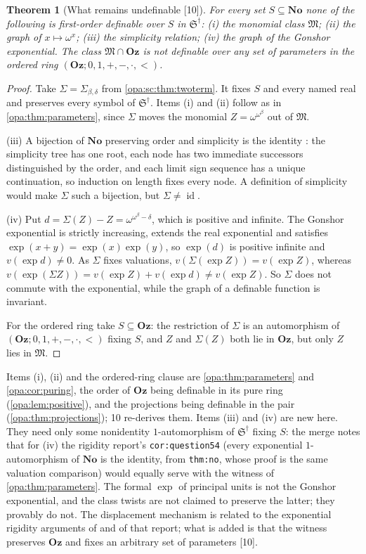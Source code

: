 \documentclass[11pt,oneside]{article}
\numberwithin{equation}{section}
\newtheorem{theorem}{Theorem}[section]
\theoremstyle{definition}
\theoremstyle{remark}
\newcommand{\No}{\mathbf{No}}
\newcommand{\Oz}{\mathbf{Oz}}
\newcommand{\Mon}{\mathfrak M}
\newcommand{\id}{\operatorname{id}}
\newcommand{\src}[1]{\textup{\textsf{\small[#1]}}}
\newcommand{\lbl}[1]{\nolinkurl{#1}}
\begin{document}
\begin{theorem}[What remains undefinable \src{10}]\label{opa:sc:thm:undef}
For every set $S\subseteq\No$ none of the following is first-order definable over
$S$ in $\mathfrak S^\dagger$: \textup{(i)} the monomial class $\Mon$;
\textup{(ii)} the graph of $x\mapsto\omega^x$; \textup{(iii)} the simplicity
relation; \textup{(iv)} the graph of the Gonshor exponential. The class
$\Mon\cap\Oz$ is not definable over any set of parameters in the ordered ring
$(\Oz;0,1,+,-,\cdot,<)$.
\end{theorem}
\begin{proof}
Take $\Sigma=\Sigma_{\beta,\delta}$ from \cref{opa:sc:thm:twoterm}. It fixes $S$ and every
named real and preserves every symbol of $\mathfrak S^\dagger$. Items (i) and (ii)
follow as in \cref{opa:thm:parameters}, since $\Sigma$ moves the monomial
$Z=\omega^{\omega^\beta}$ out of $\Mon$.

(iii) A bijection of $\No$ preserving order and simplicity is the identity
\cite[Proposition 5.1]{KKS}: the simplicity tree has one root, each node has two
immediate successors distinguished by the order, and each limit sign sequence has
a unique continuation, so induction on length fixes every node. A definition of
simplicity would make $\Sigma$ such a bijection, but $\Sigma\ne\id$.

(iv) Put $d=\Sigma(Z)-Z=\omega^{\omega^\beta-\delta}$, which is positive and infinite.
The Gonshor exponential is strictly increasing, extends the real exponential and
satisfies $\exp(x+y)=\exp(x)\exp(y)$, so $\exp(d)$ is positive infinite and
$v(\exp d)\ne0$. As $\Sigma$ fixes valuations,
$v(\Sigma(\exp Z))=v(\exp Z)$, whereas
$v(\exp(\Sigma Z))=v(\exp Z)+v(\exp d)\ne v(\exp Z)$. So $\Sigma$ does not commute
with the exponential, while the graph of a definable function is invariant.

For the ordered ring take $S\subseteq\Oz$: the restriction of $\Sigma$ is an
automorphism of $(\Oz;0,1,+,-,\cdot,<)$ fixing $S$, and $Z$ and $\Sigma(Z)$ both lie in
$\Oz$, but only $Z$ lies in $\Mon$.
\end{proof}

Items (i), (ii) and the ordered-ring clause are \cref{opa:thm:parameters} and
\cref{opa:cor:puring}, the order of $\Oz$ being definable in its pure ring
(\cref{opa:lem:positive}), and the projections being definable in the pair
(\cref{opa:thm:projections}); 10 re-derives them. Items (iii) and (iv) are new
here. They need only some nonidentity $1$-automorphism of $\mathfrak S^\dagger$
fixing $S$: the merge notes that for (iv) the rigidity report's
\lbl{cor:question54} (every exponential $1$-automorphism of $\No$ is the
identity, from \lbl{thm:no}, whose proof is the same valuation comparison)
would equally serve with the witness of \cref{opa:thm:parameters}. The formal
$\exp$ of principal units is not the Gonshor exponential, and the class twists
are not claimed to preserve the latter; they provably do not. The displacement
mechanism is related to the exponential rigidity arguments of \cite{KKS} and
of that report; what is added is that the witness preserves $\Oz$ and fixes an
arbitrary set of parameters \src{10}.
\end{document}
